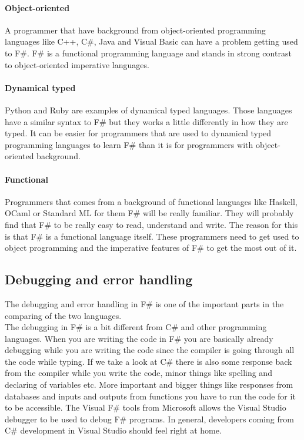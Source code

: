 \documentclass[12pt, a4paper]{article}
\begin{document}
\paragraph{Object-oriented}
A programmer that have background from object-oriented programming languages like C++, C\#, Java and Visual Basic can have a problem getting used to F\#. F\# is a functional programming language and stands in strong contrast to object-oriented imperative languages.

\paragraph{Dynamical typed}
Python and Ruby are examples of dynamical typed languages. Those languages have a similar syntax to F\# but they works a little differently in how they are typed. It can be easier for programmers that are used to dynamical typed programming languages to learn F\# than it is for programmers with object-oriented background.  

\paragraph{Functional}
Programmers that comes from a background of functional languages like Haskell, OCaml or Standard ML for them F\# will be really familiar. They will probably find that F\# to be really easy to read, understand and write. The reason for this is that F\# is a functional language itself. These programmers need to get used to object programming and the imperative features of F\# to get the most out of it.

\newpage
\subsection{Debugging and error handling}
\label{debug}

The debugging and error handling in F\# is one of the important parts in the comparing of the two languages.\\

The debugging in F\# is a bit different from C\# and other programming languages. When you are writing the code in F\# you are basically already debugging while you are writing the code since the compiler is going through all the code while typing. If we take a look at C\# there is also some response back from the compiler while you write the code, minor things like spelling and declaring of variables etc. More important and bigger things like responses from databases and inputs and outputs from functions you have to run the code for it to be accessible. The Visual F\# tools from Microsoft allows the Visual Studio debugger to be used to debug F\# programs. In general, developers coming from C\# development in Visual Studio should feel right at home.\\
\end{document}
